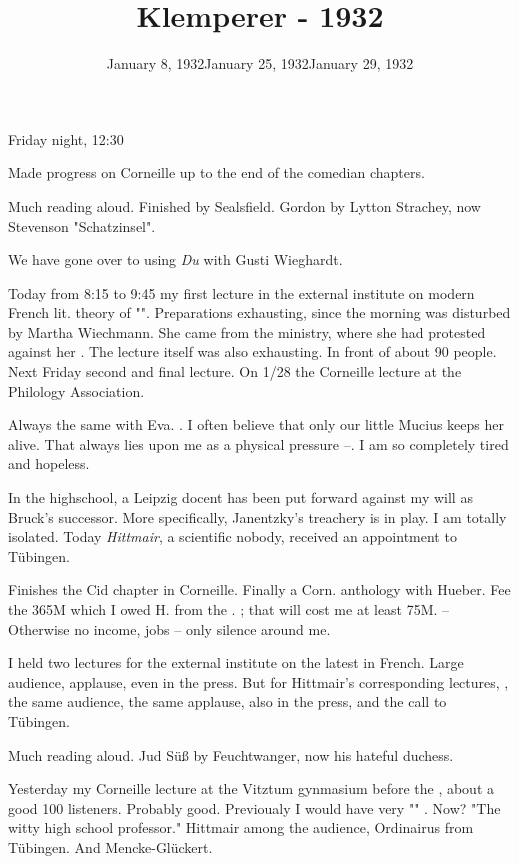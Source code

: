 \documentclass{article}
\title{Klemperer - 1932}
\begin{document}
\date{January 8, 1932}
Friday night, 12:30

Made progress on Corneille up to the end of the comedian chapters.

Much reading aloud. Finished  by Sealsfield. Gordon by Lytton Strachey, now Stevenson "Schatzinsel".

We have gone over to using \textit{Du} with Gusti Wieghardt.

Today from 8:15 to 9:45 my first lecture in the external institute on modern French lit. theory of "". Preparations exhausting, since the morning was disturbed by Martha Wiechmann. She came from the ministry, where she had protested against her . The lecture itself was also exhausting. In front of about 90 people. Next Friday second and final lecture. On 1/28 the Corneille lecture at the Philology Association.

\date{January 25, 1932}

Always the same with Eva. . I often believe that only our little Mucius 
keeps her alive. That always lies upon me as a physical pressure --. I am so completely tired and hopeless.

In the highschool, a Leipzig docent has been put forward against my will as Bruck's successor. More specifically, Janentzky's treachery is in play. I am totally isolated. Today \textit{Hittmair}, a scientific nobody, received an appointment to T\"ubingen. 

Finishes the Cid chapter in Corneille. Finally  a Corn. anthology with Hueber. Fee the 365M which I owed H. from the . ; that will cost me at least 75M. -- Otherwise no income, jobs -- only silence around me.

I held two lectures for the external institute on the latest in French. Large audience, applause, even in the press. But for Hittmair's corresponding lectures, , the same audience, the same applause, also in the press, and the call to T\"ubingen.

Much reading aloud. Jud S\"uß by Feuchtwanger, now his hateful duchess.

\date{January 29, 1932}

Yesterday my Corneille lecture at the Vitztum gynmasium before the , about a good 100 listeners. Probably good. Previoualy I would have very "" . Now? "The witty high school professor." Hittmair among the audience, Ordinairus from T\"ubingen. And Mencke-Gl\"uckert. 
\end{document}
